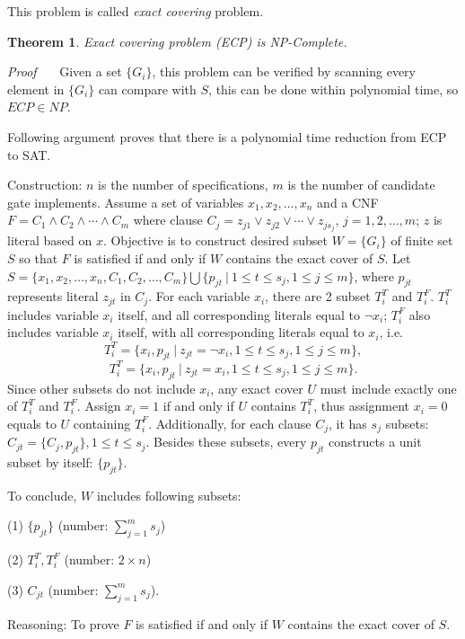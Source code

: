 \documentclass[11pt,twoside, onecolumn]{IEEEtran}
\newtheorem{Theorem}{Theorem}[section]
\begin{document}
This problem is called \emph{exact covering} problem. 
\begin{Theorem}
Exact covering problem (ECP) is NP-Complete.
\end{Theorem}

\textit{Proof} \ \ \ Given a set $\{G_i\}$, this problem can be verified by scanning every element in
$\{G_i\}$ can compare with $S$, this can be done within polynomial time, so $ECP \in NP$.

Following argument proves that there is a polynomial time reduction from ECP to SAT. 

Construction: $n$ is the number of specifications, $m$ is the number of candidate gate implements. Assume a set of
variables $x_1,x_2,\dots,x_n$ and a CNF $F = C_1\land C_2\land \cdots \land C_m$ where clause 
$C_j = z_{j1}\lor z_{j2} \lor \cdots \lor z_{js_j}$, $j = 1,2,\dots,m$; $z$ is literal based on $x$.
Objective is to construct desired subset $W = \{G_i\}$ of finite set $S$ so that $F$ is satisfied
if and only if $W$ contains the exact cover of $S$.
Let $S = \{x_1,x_2,\dots, x_n, C_1, C_2,\dots, C_m\} \bigcup \{p_{jt}\ |\ 1\leq t \leq s_j, 1\leq j\leq m \}$,
where $p_{jt}$ represents literal $z_{jt}$ in $C_j$. For each variable $x_i$, there are 2 subset
$T_i^T$ and $T_i^F$. $T_i^T$ includes variable $x_i$ itself, and all corresponding literals
equal to $\neg x_i$; $T_i^F$ also includes variable $x_i$ itself, with all corresponding literals
equal to $x_i$, i.e.
$$T_i^T = \{x_i, p_{jt}\ |\ z_{jt} = \neg x_i, 1\leq t\leq s_j, 1\leq j\leq m\},$$
$$T_i^T = \{x_i, p_{jt}\ |\ z_{jt} =  x_i, 1\leq t\leq s_j, 1\leq j\leq m\}.$$
Since other subsets do not include $x_i$, any exact cover $U$ must include exactly one
of $T_i^T$ and $T_i^F$. Assign $x_i = 1$ if and only if $U$ contains $T_i^T$, thus assignment
$x_i = 0$ equals to $U$ containing $T_i^F$. Additionally, for each clause $C_j$, it has $s_j$ subsets:
$C_{jt} = \{C_j, p_{jt}\}, 1\leq t \leq s_j$. Besides these subsets, every $p_{jt}$ constructs a unit
subset by itself: $\{p_{jt}\}$.

To conclude, $W$ includes following subsets:\par
(1) $\{p_{jt}\}$ (number: $\sum_{j=1}^{m}s_j$)\par
(2) $T_i^T, T_i^F$ (number: $2\times n$)\par
(3) $C_{jt}$ (number: $\sum_{j=1}^{m}s_j$).\par

Reasoning: To prove $F$ is satisfied
if and only if $W$ contains the exact cover of $S$. 
\end{document}
